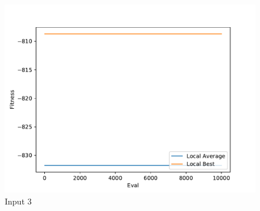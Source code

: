 \documentclass{standalone}
\begin{document}
\begin{figure}[!htb]
	\caption{Input 3}
	\label{fig:graph_3039}
	\includegraphics[width=\textwidth]{../graphs/graphs/3039.pdf}
\end{figure}
\end{document}
